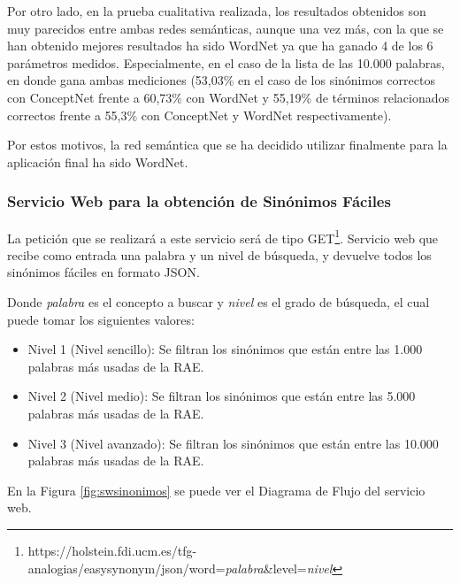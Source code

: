 Por otro lado, en la prueba cualitativa realizada, los resultados obtenidos son muy parecidos entre ambas redes semánticas, aunque una vez más, con la que se han obtenido mejores resultados ha sido WordNet ya que ha ganado 4 de los 6 parámetros medidos. Especialmente, en el caso de la lista de las 10.000 palabras, en donde gana ambas mediciones (53,03\% en el caso de los sinónimos correctos con ConceptNet frente a 60,73\% con WordNet y 55,19\% de términos relacionados correctos frente a 55,3\% con ConceptNet y WordNet respectivamente).

Por estos motivos, la red semántica que se ha decidido utilizar finalmente para la aplicación final ha sido WordNet.



 


\subsubsection{Servicio Web para la obtención de Sinónimos Fáciles}
\label{cap:subsec:sw_sinonimosfaciles}

La petición que se realizará a este servicio será de tipo GET\footnote{https://holstein.fdi.ucm.es/tfg-analogias/easysynonym/json/word=\textit{palabra}\&level=\textit{nivel}}.
Servicio web que recibe como entrada una palabra y un nivel de búsqueda, y devuelve todos los sinónimos fáciles en formato JSON. 

Donde \textit{palabra} es el concepto a buscar y \textit{nivel} es el grado de búsqueda, el cual puede tomar los siguientes valores:
\begin{itemize}
	\item Nivel 1 (Nivel sencillo): Se filtran los sinónimos que están entre las 1.000 palabras más usadas de la RAE.
	\item Nivel 2 (Nivel medio): Se filtran los sinónimos que están entre las 5.000 palabras más usadas de la RAE.
	\item Nivel 3 (Nivel avanzado): Se filtran los sinónimos que están entre las 10.000 palabras más usadas de la RAE.
\end{itemize}
En la Figura \ref{fig:swsinonimos} se puede ver el Diagrama de Flujo del servicio web.

